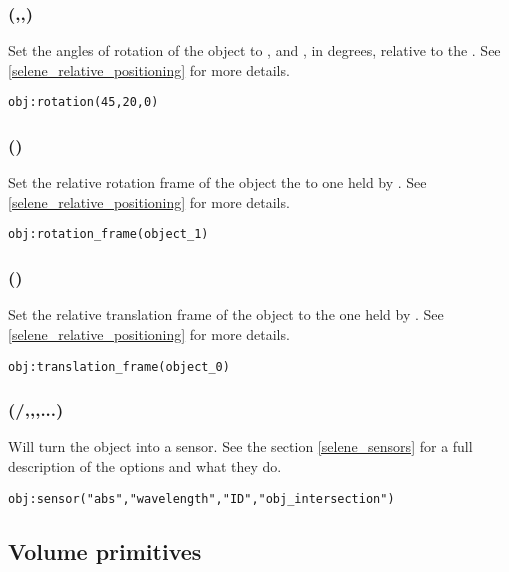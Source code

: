 \subsubsection[rotation]{(\lft{$\alpha$},\lft{$\beta$},\lft{$\gamma$})}

Set the angles of rotation of the object to \lft{$\alpha$}, \lft{$\beta$} and \lft{$\gamma$}, in degrees, relative to the . See \ref{selene_relative_positioning} for more details.
\begin{lstlisting}
obj:rotation(45,20,0)
\end{lstlisting}

\subsubsection[rotation\_frame]{()}

Set the relative rotation frame of the object the to one held by . See \ref{selene_relative_positioning} for more details.
\begin{lstlisting}
obj:rotation_frame(object_1)
\end{lstlisting}

\subsubsection[translation\_frame]{()}

Set the relative translation frame of the object to the one held by . See \ref{selene_relative_positioning} for more details.
\begin{lstlisting}
obj:translation_frame(object_0)
\end{lstlisting}

\subsubsection[sensor]{(/,,,...)}

Will turn the object into a sensor. See the section \ref{selene_sensors} for a full description of the options and what they do.
\begin{lstlisting}
obj:sensor("abs","wavelength","ID","obj_intersection")
\end{lstlisting}

\newpage
\subsection{Volume primitives}

